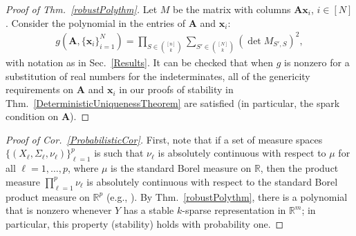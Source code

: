 \documentclass[9pt,twocolumn]{pnas-new}
\begin{document}
\begin{proof}[Proof of Thm.~\ref{robustPolythm}]
Let $M$ be the matrix with columns $\mathbf{A}\mathbf{x}_i$, $i \in [N]$.  Consider the polynomial \cite[Sec.~IV]{Hillar15} in the entries of $\mathbf{A}$ and $\mathbf{x}_i$:
\begin{align*}
g(\mathbf{A}, \{\mathbf{x}_i\}_{i=1}^N) = \prod_{S \in {[n] \choose k}} \sum_{S' \in {[N] \choose k}} (\det M_{S',S})^2,
\end{align*}
with notation as in Sec.~\ref{Results}.  
It can be checked that when $g$ is nonzero for a substitution of real numbers for the indeterminates, all of the genericity requirements on $\mathbf{A}$ and $\mathbf{x}_i$ in our proofs of stability in Thm.~\ref{DeterministicUniquenessTheorem} are satisfied (in particular, the spark condition on $\mathbf{A}$). %
\end{proof}

\begin{proof}[Proof of Cor.~\ref{ProbabilisticCor}]
First, note that if a set of measure spaces $\{(X_{\ell}, \Sigma_{\ell}, \nu_{\ell})\}_{\ell=1}^p$ is such that $\nu_{\ell}$ is absolutely continuous with respect to $\mu$ for all $\ell = 1, \ldots, p$, where $\mu$ is the standard Borel measure on $\mathbb{R}$, then the product measure $\prod_{\ell=1}^p \nu_{\ell}$ is absolutely continuous with respect to the standard Borel product measure on $\mathbb{R}^p$ (e.g.,  \cite{folland2013real}). By Thm.~\ref{robustPolythm}, there is a polynomial that is nonzero whenever $Y$ has a stable $k$-sparse representation in $\mathbb R^m$; in particular, this property (stability) holds with probability one.
\end{proof}


%
\end{document}
